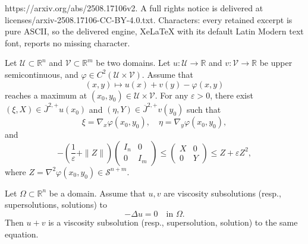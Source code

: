\documentclass[10pt,a4paper]{amsart}
\def\S{{\mathcal S}}
\def\U{{\mathcal U}}
\def\V{{\mathcal V}}
\newcommand{\R}{\mathbb{R}}
\begin{document}
https://arxiv.org/abs/2508.17106v2. A full rights notice is delivered at licenses/arxiv-2508.17106-CC-BY-4.0.txt. Characters: every retained excerpt is pure ASCII, so the delivered engine, XeLaTeX with its default Latin Modern text font, reports no missing character.
\begin{lemma}\label{TOS}
Let $\U\subset \R^n$ and $\V\subset \R^m$ be two domains. Let $u:\U\to \R$ and $v:\V \to \R$ be upper semicontinuous, and $\varphi\in C^2(\U\times \V)$. Assume that \[ (x, y)\mapsto u(x)+v(y)-\varphi(x,y) \] reaches a maximum at $(x_0,y_0)\in \U\times \V$. For any $\varepsilon>0$, there exist $(\xi, X)\in \overline{J}^{2,+}u(x_0)$ and $(\eta, Y)\in \overline{J}^{2,+}v(y_0)$ such that
\[
\xi=\nabla_x \varphi(x_0,y_0),\quad\eta=\nabla_y \varphi(x_0,y_0),    
\]
and
\[
-\left(\frac{1}{\varepsilon}+\|Z\|\right)\begin{pmatrix}
I_n & 0 \\
0 & I_m 
\end{pmatrix}\le \begin{pmatrix}
X & 0 \\
0 & Y
\end{pmatrix}\le Z+\varepsilon Z^2,
\]
where $Z=\nabla^2 \varphi(x_0, y_0)\in \S^{n+m}$. 
\end{lemma}

\begin{proposition}\label{Lapsup}
    Let $\Omega\subset \mathbb{R}^n$ be a domain. Assume that $u, v$  are viscosity subsolutions (resp., supersolutions, solutions) to 
    \[
    -\Delta u=0 \quad \text{in $\Omega$}.
    \] Then $u+v$ is a viscosity subsolution (resp., supersolution, solution) to the same equation. 
\end{proposition}
\end{document}
